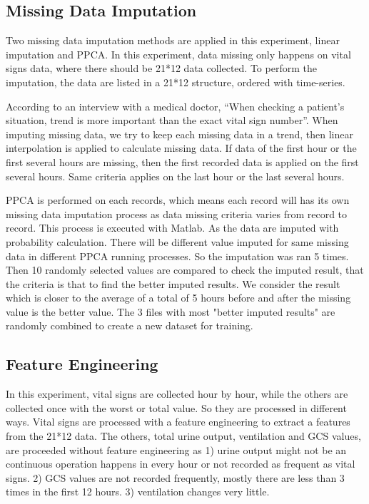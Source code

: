 \documentclass[12pt,a4paper,english
]{tunithesis}
\begin{document}
\subsection{Missing Data Imputation}

Two missing data imputation methods are applied in this experiment, linear imputation and PPCA. In this experiment, data missing only happens on vital signs data, where there should be 21*12 data collected. To perform the imputation, the data are listed in a 21*12 structure, ordered with time-series.

According to an interview with a medical doctor, \enquote{When checking a patient's situation, trend is more important than the exact vital sign number}. When imputing missing data, we try to keep each missing data in a trend, then linear interpolation is applied to calculate missing data. If data of the first hour or the first several hours are missing, then the first recorded data is applied on the first several hours. Same criteria applies on the last hour or the last several hours.

PPCA is performed on each records, which means each record will has its own missing data imputation process as data missing criteria varies from record to record. This process is executed with Matlab. As the data are imputed with probability calculation. There will be different value imputed for same missing data in different PPCA running processes. So the imputation was ran 5 times. Then 10 randomly selected values are compared to check the imputed result, that the criteria is that to find the better imputed results. We consider the result which is closer to the average of a total of 5 hours before and after the missing value is the better value. The 3 files with most "better imputed results" are randomly combined to create a new dataset for training.


\subsection{Feature Engineering}

In this experiment, vital signs are collected hour by hour, while the others are collected once with the worst or total value. So they are processed in different ways. Vital signs are processed with a feature engineering to extract a features from the 21*12 data. The others, total urine output, ventilation and GCS values, are proceeded without feature engineering as 1) urine output might not be an continuous operation happens in every hour or not recorded as frequent as vital signs. 2) GCS values are not recorded frequently, mostly there are less than 3 times in the first 12 hours. 3) ventilation changes very little.
\end{document}
